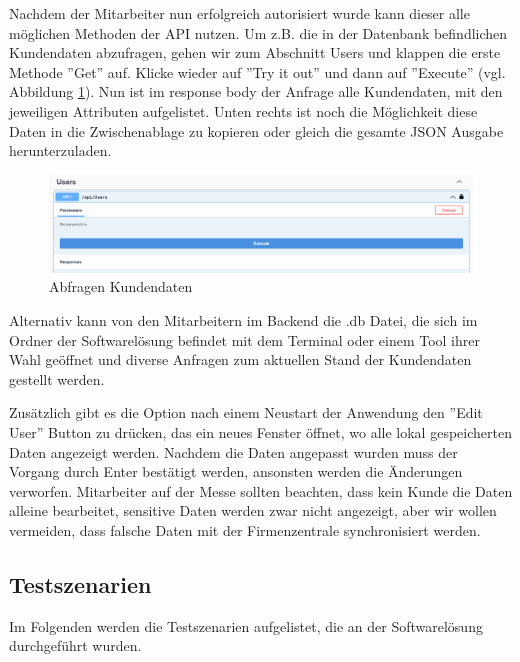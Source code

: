 Nachdem der Mitarbeiter nun erfolgreich autorisiert wurde kann dieser alle möglichen Methoden der API nutzen. Um z.B. die in der Datenbank befindlichen Kundendaten abzufragen, gehen wir zum Abschnitt Users und klappen die erste Methode ''Get'' auf. Klicke wieder auf ''Try it out'' und dann auf ''Execute'' (vgl. Abbildung \ref{fig:projektmesseswagger3}). Nun ist im response body der Anfrage alle Kundendaten, mit den jeweiligen Attributen aufgelistet. Unten rechts ist noch die Möglichkeit diese Daten in die Zwischenablage zu kopieren oder gleich die gesamte JSON Ausgabe herunterzuladen.

\begin{figure}[h]
	\centering
	\includegraphics[width=0.9\linewidth]{Images/Projekt_Messe_Swagger3}
	\caption{Abfragen Kundendaten}
	\label{fig:projektmesseswagger3}
\end{figure}

Alternativ kann von den Mitarbeitern im Backend die .db Datei, die sich im Ordner der Softwarelösung befindet mit dem Terminal oder einem Tool ihrer Wahl geöffnet und diverse Anfragen zum aktuellen Stand der Kundendaten gestellt werden.

Zusätzlich gibt es die Option nach einem Neustart der Anwendung den ''Edit User'' Button zu drücken, das ein neues Fenster öffnet, wo alle lokal gespeicherten Daten angezeigt werden. Nachdem die Daten angepasst wurden muss der Vorgang durch Enter bestätigt werden, ansonsten
werden die Änderungen verworfen. Mitarbeiter auf der Messe sollten beachten, dass kein Kunde die Daten alleine bearbeitet, sensitive Daten werden zwar nicht angezeigt, aber wir wollen vermeiden, dass falsche Daten mit der Firmenzentrale synchronisiert werden.

\newpage
\subsection{Testszenarien}

Im Folgenden werden die Testszenarien aufgelistet, die an der Softwarelösung durchgeführt wurden.

